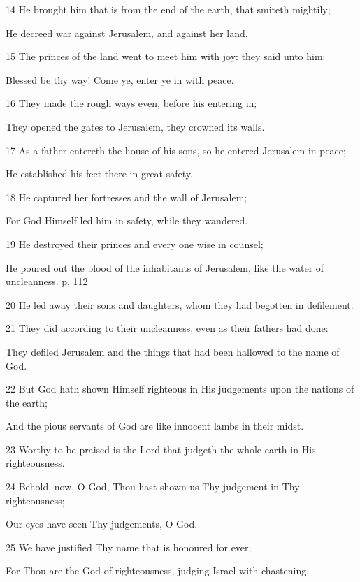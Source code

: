 \par 14 He brought him that is from the end of the earth, that smiteth mightily;
\par  He decreed war against Jerusalem, and against her land.
\par 15 The princes of the land went to meet him with joy: they said unto him:
\par  Blessed be thy way! Come ye, enter ye in with peace.
\par 16 They made the rough ways even, before his entering in;
\par  They opened the gates to Jerusalem, they crowned its walls.
\par    
\par 17 As a father entereth the house of his sons, so he entered Jerusalem in peace;
\par  He established his feet there in great safety.
\par 18 He captured her fortresses and the wall of Jerusalem;
\par  For God Himself led him in safety, while they wandered.
\par 19 He destroyed their princes and every one wise in counsel;
\par  He poured out the blood of the inhabitants of Jerusalem, like the water of uncleanness. p. 112
\par 20 He led away their sons and daughters, whom they had begotten in defilement.
\par    
\par 21 They did according to their uncleanness, even as their fathers had done:
\par  They defiled Jerusalem and the things that had been hallowed to the name of God.
\par 22 But God hath shown Himself righteous in His judgements upon the nations of the earth;
\par  And the pious servants of God are like innocent lambs in their midst.
\par 23 Worthy to be praised is the Lord that judgeth the whole earth in His righteousness.
\par    
\par 24 Behold, now, O God, Thou hast shown us Thy judgement in Thy righteousness;
\par  Our eyes have seen Thy judgements, O God.
\par 25 We have justified Thy name that is honoured for ever;
\par  For Thou are the God of righteousness, judging Israel with chastening.
